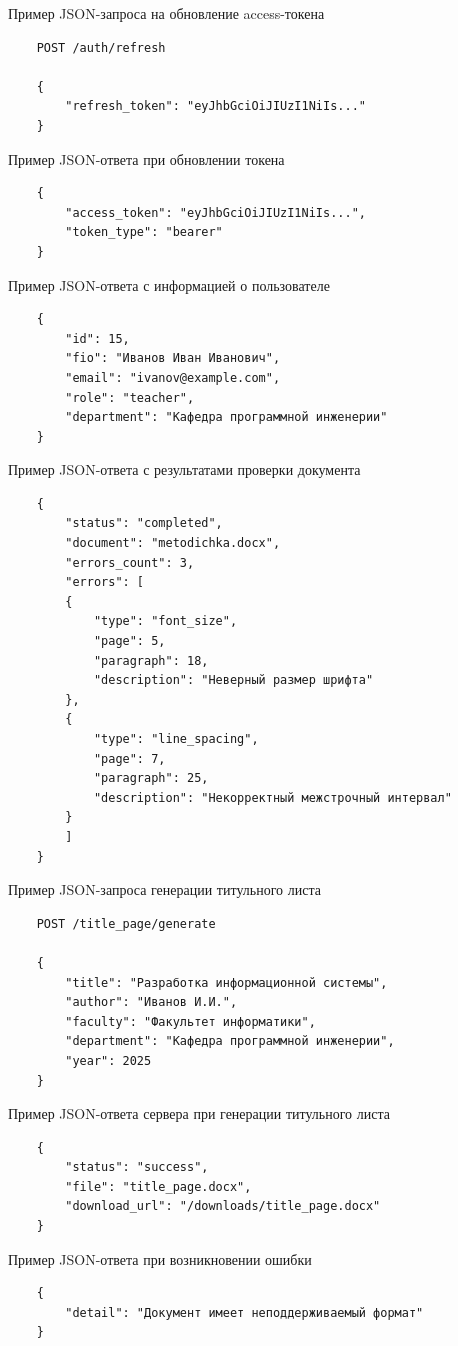 Пример JSON-запроса на обновление access-токена

\begin{verbatim}
	POST /auth/refresh
	
	{
		"refresh_token": "eyJhbGciOiJIUzI1NiIs..."
	}
\end{verbatim}

Пример JSON-ответа при обновлении токена

\begin{verbatim}
	{
		"access_token": "eyJhbGciOiJIUzI1NiIs...",
		"token_type": "bearer"
	}
\end{verbatim}

Пример JSON-ответа с информацией о пользователе

\begin{verbatim}
	{
		"id": 15,
		"fio": "Иванов Иван Иванович",
		"email": "ivanov@example.com",
		"role": "teacher",
		"department": "Кафедра программной инженерии"
	}
\end{verbatim}

Пример JSON-ответа с результатами проверки документа

\begin{verbatim}
	{
		"status": "completed",
		"document": "metodichka.docx",
		"errors_count": 3,
		"errors": [
		{
			"type": "font_size",
			"page": 5,
			"paragraph": 18,
			"description": "Неверный размер шрифта"
		},
		{
			"type": "line_spacing",
			"page": 7,
			"paragraph": 25,
			"description": "Некорректный межстрочный интервал"
		}
		]
	}
\end{verbatim}

Пример JSON-запроса генерации титульного листа

\begin{verbatim}
	POST /title_page/generate
	
	{
		"title": "Разработка информационной системы",
		"author": "Иванов И.И.",
		"faculty": "Факультет информатики",
		"department": "Кафедра программной инженерии",
		"year": 2025
	}
\end{verbatim}

Пример JSON-ответа сервера при генерации титульного листа

\begin{verbatim}
	{
		"status": "success",
		"file": "title_page.docx",
		"download_url": "/downloads/title_page.docx"
	}
\end{verbatim}

Пример JSON-ответа при возникновении ошибки

\begin{verbatim}
	{
		"detail": "Документ имеет неподдерживаемый формат"
	}
\end{verbatim}

